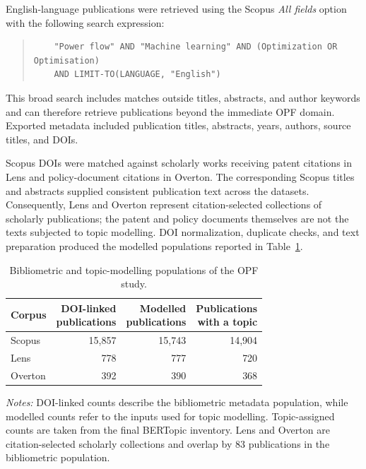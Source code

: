 \documentclass[a4paper,fleqn]{cas-sc}
\begin{document}
    English-language publications were retrieved using the Scopus \emph{All fields} option with the following search expression:
    
    \begin{quote}
    \begin{verbatim}
    "Power flow" AND "Machine learning" AND (Optimization OR Optimisation)
    AND LIMIT-TO(LANGUAGE, "English")
    \end{verbatim}
    \end{quote}
    
    This broad search includes matches outside titles, abstracts, and author keywords and can therefore retrieve publications beyond the immediate OPF domain. Exported metadata included publication titles, abstracts, years, authors, source titles, and DOIs.
    
    Scopus DOIs were matched against scholarly works receiving patent citations in Lens and policy-document citations in Overton. The corresponding Scopus titles and abstracts supplied consistent publication text across the datasets. Consequently, Lens and Overton represent citation-selected collections of scholarly publications; the patent and policy documents themselves are not the texts subjected to topic modelling. DOI normalization, duplicate checks, and text preparation produced the modelled populations reported in Table~\ref{tab:opf_corpus_populations}.
    
    \begin{table}[htbp]
    \centering
    \caption{Bibliometric and topic-modelling populations of the OPF study.}
    \label{tab:opf_corpus_populations}
    \small
    \setlength{\tabcolsep}{6pt}
    \renewcommand{\arraystretch}{1.15}
    \begin{tabular}{lrrr}
    \toprule
    Corpus
    & \shortstack{DOI-linked\\publications}
    & \shortstack{Modelled\\publications}
    & \shortstack{Publications\\with a topic} \\
    \midrule
    Scopus  & 15,857 & 15,743 & 14,904 \\
    Lens    & 778    & 777    & 720 \\
    Overton & 392    & 390    & 368 \\
    \bottomrule
    \end{tabular}
    \vspace{2mm}
    \begin{minipage}{\textwidth}
    \footnotesize
    \textit{Notes:} DOI-linked counts describe the bibliometric metadata population, while modelled counts refer to the inputs used for topic modelling. Topic-assigned counts are taken from the final BERTopic inventory. Lens and Overton are citation-selected scholarly collections and overlap by 83 publications in the bibliometric population.
    \end{minipage}
    \end{table}
    
\end{document}
